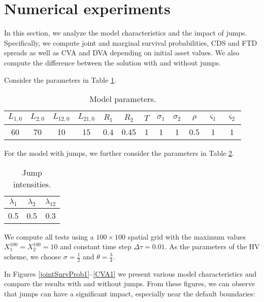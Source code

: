 \section{Numerical experiments}
\label{numerical_experiments}
In this section, we analyze the model characteristics and the impact of jumps. Specifically, we compute joint and marginal survival probabilities, CDS and FTD spreads as well as CVA and DVA depending on initial asset values. We also compute the difference between the solution with and without jumps.

Consider the parameters in Table \ref{table:params}.
\begin{table}[H]
	\begin{center}
		\begin{tabular}{| c | c | c | c | c | c | c | c | c | c | c | c |}
			\hline
			$L_{1,0}$ & $L_{2, 0}$ & $L_{12, 0}$ & $L_{21, 0}$ & $R_1$ & $R_2$ & $T$ & $\sigma_1$ & $\sigma_2$ & $\rho$ & $\varsigma_1$ & $\varsigma_2$ \\ 
			\hline
			60 & 70 & 10 & 15 & 0.4 & 0.45 & 1 & 1 & 1  & 0.5 & 1 & 1 \\
			\hline
		\end{tabular}
	\caption{Model parameters.\label{table:params}}		
	\end{center}
\end{table}
For the model with jumps, we further consider the parameters in Table \ref{table:jumps}.
\begin{table}[H]
	\begin{center}
		\begin{tabular}{| c | c | c | }
			\hline
			 $\lambda_1$& $\lambda_2$ & $\lambda_{12}$ \\
			\hline
			0.5 & 0.5 & 0.3 \\
			\hline
		\end{tabular}
		\caption{Jump intensities.\label{table:jumps}}
	\end{center}
\end{table}

We compute all tests using a $100\times100$ spatial grid with the maximum values $X_1^{100} = X_2^{100} = 10$ and constant time step $\Delta \tau = 0.01$. As the parameters of the HV scheme, we choose $\sigma = \frac{1}{2}$ and $\theta = \frac{3}{4}$. 

In Figures \ref{jointSurvProb1}--\ref{CVA1} we present various model characteristics and compare the results with and without jumps. From these figures, we can observe that jumps can have a significant impact, especially near the default boundaries:

